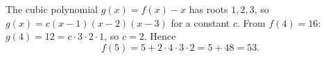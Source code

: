 The cubic polynomial $g(x)=f(x)-x$ has roots $1,2,3$, so $g(x)=c(x-1)(x-2)(x-3)$ for a constant $c$. From $f(4)=16$: $g(4)=12=c\cdot3\cdot2\cdot1$, so $c=2$. Hence
\[
f(5)=5+2\cdot4\cdot3\cdot2=5+48=\boxed{53}.
\]
